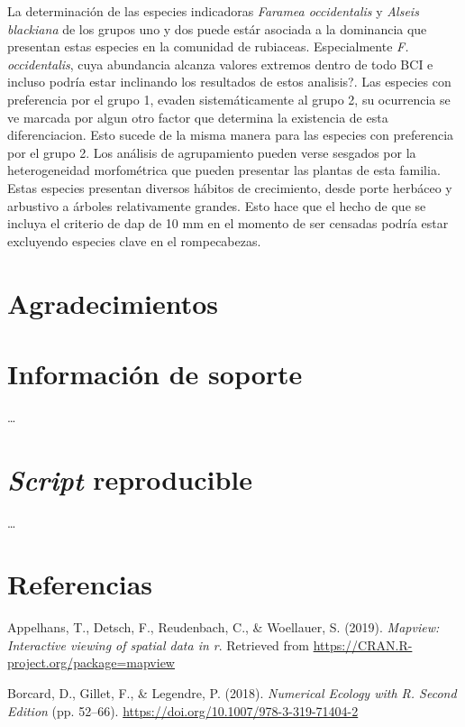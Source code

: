 \documentclass[11pt,]{article}
\begin{document}
La determinación de las especies indicadoras \emph{Faramea occidentalis}
y \emph{Alseis blackiana} de los grupos uno y dos puede estár asociada a
la dominancia que presentan estas especies en la comunidad de rubiaceas.
Especialmente \emph{F. occidentalis}, cuya abundancia alcanza valores
extremos dentro de todo BCI e incluso podría estar inclinando los
resultados de estos analisis?. Las especies con preferencia por el grupo
1, evaden sistemáticamente al grupo 2, su ocurrencia se ve marcada por
algun otro factor que determina la existencia de esta diferenciacion.
Esto sucede de la misma manera para las especies con preferencia por el
grupo 2. Los análisis de agrupamiento pueden verse sesgados por la
heterogeneidad morfométrica que pueden presentar las plantas de esta
familia. Estas especies presentan diversos hábitos de crecimiento, desde
porte herbáceo y arbustivo a árboles relativamente grandes. Esto hace
que el hecho de que se incluya el criterio de dap de 10 mm en el momento
de ser censadas podría estar excluyendo especies clave en el
rompecabezas.

\section{Agradecimientos}\label{agradecimientos}

\section{Información de soporte}\label{informaciuxf3n-de-soporte}

\ldots

\section{\texorpdfstring{\emph{Script}
reproducible}{Script reproducible}}\label{script-reproducible}

\ldots

\section*{Referencias}\label{referencias}

\hypertarget{refs}{}
\hypertarget{ref-cita_mapview}{}
Appelhans, T., Detsch, F., Reudenbach, C., \& Woellauer, S. (2019).
\emph{Mapview: Interactive viewing of spatial data in r}. Retrieved from
\url{https://CRAN.R-project.org/package=mapview}

\hypertarget{ref-borcard_legendre}{}
Borcard, D., Gillet, F., \& Legendre, P. (2018). \emph{Numerical Ecology
with R. Second Edition} (pp. 52--66).
\url{https://doi.org/10.1007/978-3-319-71404-2}
\end{document}
